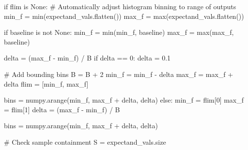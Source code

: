\documentclass[
  letterpaper,
  DIV=11,
  numbers=noendperiod]{scrartcl}
\newenvironment{Shaded}{\begin{snugshade}}{\end{snugshade}}
\newcommand{\BuiltInTok}[1]{\textcolor[rgb]{0.00,0.23,0.31}{#1}}
\newcommand{\CommentTok}[1]{\textcolor[rgb]{0.37,0.37,0.37}{#1}}
\newcommand{\ControlFlowTok}[1]{\textcolor[rgb]{0.00,0.23,0.31}{#1}}
\newcommand{\DecValTok}[1]{\textcolor[rgb]{0.68,0.00,0.00}{#1}}
\newcommand{\FloatTok}[1]{\textcolor[rgb]{0.68,0.00,0.00}{#1}}
\newcommand{\KeywordTok}[1]{\textcolor[rgb]{0.00,0.23,0.31}{#1}}
\newcommand{\NormalTok}[1]{\textcolor[rgb]{0.00,0.23,0.31}{#1}}
\newcommand{\OperatorTok}[1]{\textcolor[rgb]{0.37,0.37,0.37}{#1}}
\newcommand{\VariableTok}[1]{\textcolor[rgb]{0.07,0.07,0.07}{#1}}
\begin{document}
\begin{Shaded}
\begin{Highlighting}[]
  \ControlFlowTok{if}\NormalTok{ flim }\KeywordTok{is} \VariableTok{None}\NormalTok{:}
    \CommentTok{\# Automatically adjust histogram binning to range of outputs}
\NormalTok{    min\_f }\OperatorTok{=} \BuiltInTok{min}\NormalTok{(expectand\_vals.flatten())}
\NormalTok{    max\_f }\OperatorTok{=} \BuiltInTok{max}\NormalTok{(expectand\_vals.flatten())}

    \ControlFlowTok{if}\NormalTok{ baseline }\KeywordTok{is} \KeywordTok{not} \VariableTok{None}\NormalTok{:}
\NormalTok{      min\_f }\OperatorTok{=} \BuiltInTok{min}\NormalTok{(min\_f, baseline)}
\NormalTok{      max\_f }\OperatorTok{=} \BuiltInTok{max}\NormalTok{(max\_f, baseline)}

\NormalTok{    delta }\OperatorTok{=}\NormalTok{ (max\_f }\OperatorTok{{-}}\NormalTok{ min\_f) }\OperatorTok{/}\NormalTok{ B}
    \ControlFlowTok{if}\NormalTok{ delta }\OperatorTok{==} \DecValTok{0}\NormalTok{:}
\NormalTok{      delta }\OperatorTok{=} \FloatTok{0.1}

    \CommentTok{\# Add bounding bins}
\NormalTok{    B }\OperatorTok{=}\NormalTok{ B }\OperatorTok{+} \DecValTok{2}
\NormalTok{    min\_f }\OperatorTok{=}\NormalTok{ min\_f }\OperatorTok{{-}}\NormalTok{ delta}
\NormalTok{    max\_f }\OperatorTok{=}\NormalTok{ max\_f }\OperatorTok{+}\NormalTok{ delta}
\NormalTok{    flim }\OperatorTok{=}\NormalTok{ [min\_f, max\_f]}

\NormalTok{    bins }\OperatorTok{=}\NormalTok{ numpy.arange(min\_f, max\_f }\OperatorTok{+}\NormalTok{ delta, delta)}
  \ControlFlowTok{else}\NormalTok{:}
\NormalTok{    min\_f }\OperatorTok{=}\NormalTok{ flim[}\DecValTok{0}\NormalTok{]}
\NormalTok{    max\_f }\OperatorTok{=}\NormalTok{ flim[}\DecValTok{1}\NormalTok{]}
\NormalTok{    delta }\OperatorTok{=}\NormalTok{ (max\_f }\OperatorTok{{-}}\NormalTok{ min\_f) }\OperatorTok{/}\NormalTok{ B}

\NormalTok{    bins }\OperatorTok{=}\NormalTok{ numpy.arange(min\_f, max\_f }\OperatorTok{+}\NormalTok{ delta, delta)}

  \CommentTok{\# Check sample containment}
\NormalTok{  S }\OperatorTok{=}\NormalTok{ expectand\_vals.size}


\end{Highlighting}
\end{Shaded}
\end{document}
